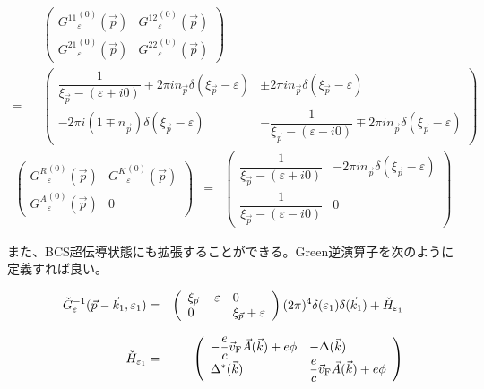 \documentclass[uplatex,a4j,12pt,dvipdfmx]{jsarticle}
\begin{document}
\begin{eqnarray}
	&&
	\left(
	\begin{array}{ll}
		{G^{11}{}}^{(0)}_{\varepsilon}(\vec{p}) & {G^{12}{}}^{(0)}_{\varepsilon}(\vec{p})
		\\
		{G^{21}{}}^{(0)}_{\varepsilon}(\vec{p}) & {G^{22}{}}^{(0)}_{\varepsilon}(\vec{p})
	\end{array}\right)
	\\ = &&
	\left(
	\begin{array}{cc}
		\dfrac{1}{\xi_{\vec{p}} - ( \varepsilon + i0 ) } \mp 2 \pi i n_{\vec{p}} \delta( \xi_{\vec{p}} - \varepsilon )
		 &
		\pm 2 \pi i n_{\vec{p}} \delta( \xi_{\vec{p}} - \varepsilon )
		\\
		- 2 \pi i ( 1 \mp n_{\vec{p}} ) \delta( \xi_{\vec{p}} - \varepsilon )
		 &
		- \dfrac{1}{\xi_{\vec{p}} - ( \varepsilon - i0 ) } \mp 2 \pi i n_{\vec{p}} \delta( \xi_{\vec{p}} - \varepsilon )
	\end{array}\right)
\end{eqnarray}
\begin{eqnarray}
	\left(
	\begin{array}{ll}
		{G^{R}{}}^{(0)}_{\varepsilon}(\vec{p}) & {G^{K}{}}^{(0)}_{\varepsilon}(\vec{p})
		\\
		{G^{A}{}}^{(0)}_{\varepsilon}(\vec{p}) & 0
	\end{array}\right)
	&=&
	\left(
	\begin{array}{cc}
		\dfrac{1}{\xi_{\vec{p}} - ( \varepsilon + i0 ) }
		 &
		- 2 \pi i n_{\vec{p}} \delta( \xi_{\vec{p}} - \varepsilon )
		\\
		\dfrac{1}{\xi_{\vec{p}} - ( \varepsilon - i0 )}
		 &
		0
	\end{array}\right)
\end{eqnarray}



また、BCS超伝導状態にも拡張することができる。Green逆演算子を次のように定義すれば良い。

\begin{eqnarray}
	\check{G}^{-1}_{\varepsilon}(\vec{p}-\vec{k}_{1},\varepsilon_{1})
	&=&
	\left(
	\begin{array}{ll}
		\xi_{\vec{p}} - \varepsilon & 0
		\\
		0                           & \xi_{\vec{p}} + \varepsilon
	\end{array}
	\right)
	(2 \pi)^{4}
	\delta(\varepsilon_{1})
	\delta(\vec{k}_{1})
	+
	\check{H}_{\varepsilon_{1}}
	\\[3mm]
	\check{H}_{\varepsilon_{1}}
	&=&
	\left(
	\begin{array}{ll}
			- \dfrac{e}{c} \vec{v}_{\rm F} \vec{A}(\vec{k}) + e \phi & - \Delta(\vec{k})
			\\
			\Delta^{*}(\vec{k})                                      & \dfrac{e}{c} \vec{v}_{\rm F} \vec{A}(\vec{k}) + e \phi
		\end{array}
	\right)
\end{eqnarray}
\end{document}
